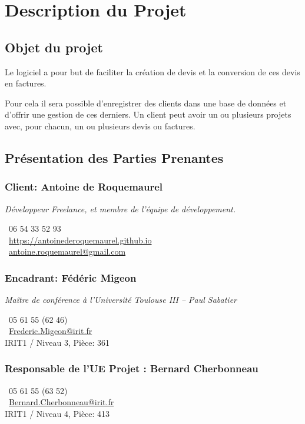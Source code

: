 \chapter{Description du Projet}
\section{Objet du projet}
Le logiciel a pour but de faciliter la création de devis et la conversion de ces devis en factures. 

Pour cela il sera possible d’enregistrer des
clients dans une base de données et d’offrir une gestion de ces derniers. Un client peut avoir un ou plusieurs projets avec, pour chacun, un ou
plusieurs devis ou factures.

\section{Présentation des Parties Prenantes}
	\subsection{Client: Antoine de Roquemaurel}
	\textit{Développeur Freelance, et membre de l'équipe de développement. }

		\Telefon~06 54 33 52 93\\
		\Mundus~\url{https://antoinederoquemaurel.github.io}\\
		\Letter~\href{mailto:antoine.roquemaurel@gmail.com}{antoine.roquemaurel@gmail.com} \\		
	\subsection{Encadrant: Fédéric Migeon}
	\textit{Maître de conférence à l'Université Toulouse III -- Paul Sabatier}

		\Telefon~05 61 55 (62 46) \\
		\Letter~\href{mailto:Frederic.Migeon@irit.fr}{Frederic.Migeon@irit.fr} \\
		IRIT1 / Niveau 3, Pièce: 361 \\

		\subsection{Responsable de l'UE Projet : Bernard Cherbonneau}
		\Telefon~05 61 55 (63 52)\\
		\Letter~\href{mailto:Bernard.Cherbonneau@irit.fr}{Bernard.Cherbonneau@irit.fr}\\
		IRIT1 / Niveau 4, Pièce: 413

